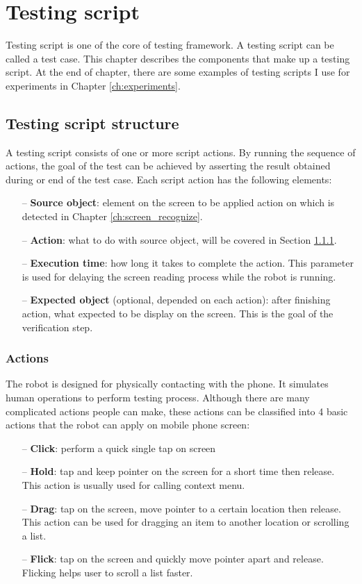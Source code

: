 \chapter{Testing script}
\label{ch:test_script}
Testing script is one of the core of testing framework.
A testing script can be called a test case.
This chapter describes the components that make up a testing script. At the end of chapter, there are some examples of testing scripts I use for experiments in Chapter \ref{ch:experiments}.

\section{Testing script structure}
\label{sec:script_comp}
A testing script consists of one or more script actions. By running the sequence of actions, the goal of the test can be achieved by asserting the result obtained during or end of the test case. Each script action has the following elements:
    \begin{itemize}
		\item[--] \textbf{Source object}: element on the screen to be applied action on which is detected in Chapter \ref{ch:screen_recognize}.
		\item[--] \textbf{Action}: what to do with source object, will be covered in Section \ref{sec:actions}.
		\item[--] \textbf{Execution time}: how long it takes to complete the action. This parameter is used for delaying the screen reading process while the robot is running.
		\item[--] \textbf{Expected object} (optional, depended on each action): after finishing action, what expected to be display on the screen. This is the goal of the verification step.
	\end{itemize}

\subsection{Actions}
\label{sec:actions}
The robot is designed for physically contacting with the phone. It simulates human operations to perform testing process.
Although there are many complicated actions people can make, these actions can be classified into 4 basic actions that the robot can apply on mobile phone screen:

    \begin{itemize}
		\item[--] \textbf{Click}: perform a quick single tap on screen
		\item[--] \textbf{Hold}: tap and keep pointer on the screen for a short time then release. This action is usually used for calling context menu.
		\item[--] \textbf{Drag}: tap on the screen, move pointer to a certain location then release. This action can be used for dragging an item to another location or scrolling a list.
		\item[--] \textbf{Flick}: tap on the screen and quickly move pointer apart and release. Flicking helps user to scroll a list faster.
	\end{itemize}

